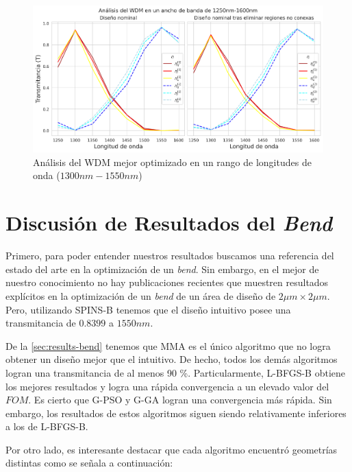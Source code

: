 \begin{figure}[ht]
  \centering
  \includegraphics[width=\textwidth]{image/results/wdm/best/broadband-wdm.png}
  \caption{Análisis del WDM mejor optimizado en un rango de longitudes de onda ($1300 nm-1550 nm$)}
  \label{fig:broadband-wdm}
\end{figure}



\section{Discusión de Resultados del \emph{Bend}}

Primero, para poder entender nuestros resultados buscamos una referencia del estado del arte
en la optimización de un \emph{bend}.
Sin embargo, en el mejor de nuestro conocimiento no hay publicaciones recientes que muestren
resultados explícitos en la optimización de un \emph{bend} de un área de diseño de $2 \mu m \times 2 \mu m$.
Pero, utilizando SPINS-B tenemos que el diseño intuitivo posee una transmitancia de $0.8399$ a $1550 nm$.


De la \autoref{sec:results-bend} tenemos que MMA es el único algoritmo que no logra obtener un diseño
mejor que el intuitivo. 
De hecho, todos los demás algoritmos logran una transmitancia de al menos 90 \%.
Particularmente, L-BFGS-B obtiene los mejores resultados y logra una rápida convergencia a un
elevado valor del $FOM$.
Es cierto que G-PSO y G-GA logran una convergencia más rápida. Sin embargo, los 
resultados de estos algoritmos siguen siendo relativamente inferiores a los de L-BFGS-B.

Por otro lado, es interesante destacar que cada algoritmo encuentró geometrías distintas como se
señala a continuación:

